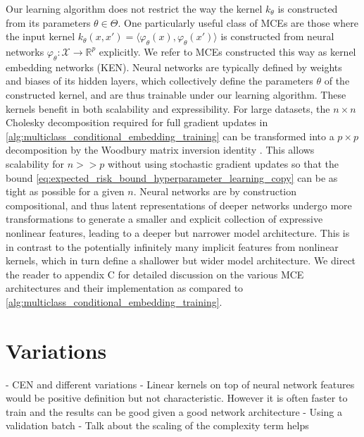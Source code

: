 \documentclass[twoside]{article}
\begin{document}
		Our learning algorithm does not restrict the way the kernel $k_{\theta}$ is constructed from its parameters $\theta \in \Theta$. One particularly useful class of \gls{MCE}s are those where the input kernel $k_{\theta}(x, x') = \langle \varphi_{\theta}(x), \varphi_{\theta}(x') \rangle$ is constructed from neural networks $\varphi_{\theta} : \mathcal{X} \to \mathbb{R}^{p}$ explicitly. We refer to \gls{MCE}s constructed this way as kernel embedding networks (KEN). Neural networks are typically defined by weights and biases of its hidden layers, which collectively define the parameters $\theta$ of the constructed kernel, and are thus trainable under our learning algorithm. These kernels benefit in both scalability and expressibility. For large datasets, the $n \times n$ Cholesky decomposition required for full gradient updates in \cref{alg:multiclass_conditional_embedding_training} can be transformed into a $p \times p$ decomposition by the Woodbury matrix inversion identity \citep{higham2002accuracy}. This allows scalability for $n >> p$ without using stochastic gradient updates so that the bound \eqref{eq:expected_risk_bound_hyperparameter_learning_copy} can be as tight as possible for a given $n$. Neural networks are by construction compositional, and thus latent representations of deeper networks undergo more transformations to generate a smaller and explicit collection of expressive nonlinear features, leading to a deeper but narrower model architecture. This is in contrast to the potentially infinitely many implicit features from nonlinear kernels, which in turn define a shallower but wider model architecture. We direct the reader to appendix C for detailed discussion on the various \gls{MCE} architectures and their implementation as compared to \cref{alg:multiclass_conditional_embedding_training}. 
	
	\section{Variations}
	
	\citep{wilson2016stochastic}
	
	- CEN and different variations
	- Linear kernels on top of neural network features would be positive definition but not characteristic. However it is often faster to train and the results can be good given a good network architecture
	- Using a validation batch
	- Talk about the scaling of the complexity term helps
	
\end{document}

